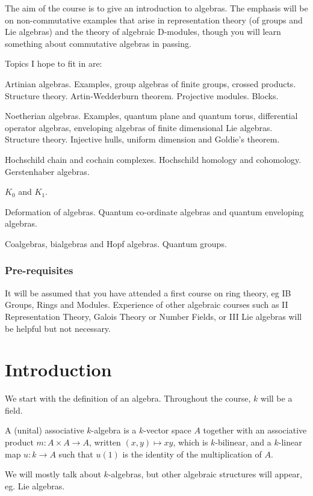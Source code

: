 \documentclass[a4paper]{article}
\begin{document}
\maketitle
{\small
\setlength{\parindent}{0em}
\setlength{\parskip}{1em}
The aim of the course is to give an introduction to algebras. The emphasis will be on non-commutative examples that arise in representation theory (of groups and Lie algebras) and the theory of algebraic D-modules, though you will learn something about commutative algebras in passing.

Topics I hope to fit in are:

Artinian algebras. Examples, group algebras of finite groups, crossed products. Structure theory. Artin-Wedderburn theorem. Projective modules. Blocks.

Noetherian algebras. Examples, quantum plane and quantum torus, differential operator algebras, enveloping algebras of finite dimensional Lie algebras. Structure theory. Injective hulls, uniform dimension and Goldie's theorem.

Hochschild chain and cochain complexes. Hochschild homology and cohomology. Gerstenhaber algebras.

$K_0$ and $K_1$.

Deformation of algebras. Quantum co-ordinate algebras and quantum enveloping algebras.

Coalgebras, bialgebras and Hopf algebras. Quantum groups.

\subsubsection*{Pre-requisites}
It will be assumed that you have attended a first course on ring theory, eg IB Groups, Rings and Modules. Experience of other algebraic courses such as II Representation Theory, Galois Theory or Number Fields, or III Lie algebras will be helpful but not necessary.
}
\tableofcontents

\setcounter{section}{-1}
\section{Introduction}
We start with the definition of an algebra. Throughout the course, $k$ will be a field.
\begin{defi}[$k$-algebra]
  A (unital) associative $k$-algebra is a $k$-vector space $A$ together with an associative product $m: A \times A \to A$, written $(x, y) \mapsto xy$, which is $k$-bilinear, and a $k$-linear map $u: k \to A$ such that $u(1)$ is the identity of the multiplication of $A$.
\end{defi}
We will mostly talk about $k$-algebras, but other algebraic structures will appear, eg. Lie algebras.
\end{document}
